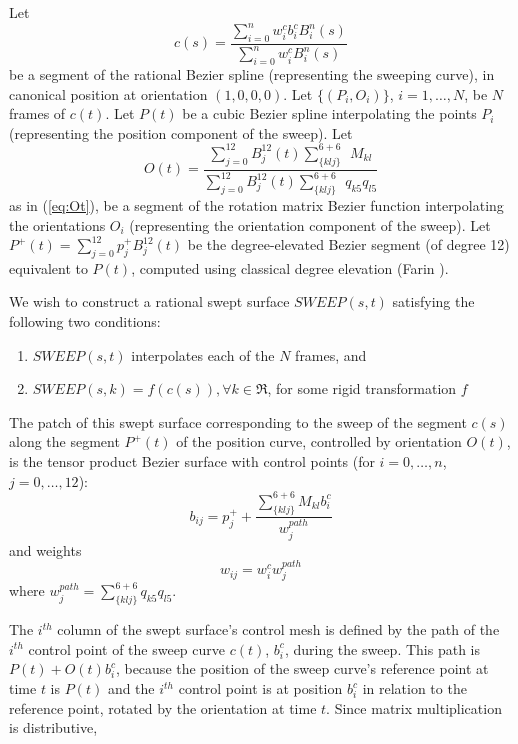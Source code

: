 \begin{theorem}
\label{thm:ten1}
Let 
\[
c(s) = \frac{\sum_{i=0}^n w_i^{c} b_i^{c} B_i^n(s)}
	    {\sum_{i=0}^n w_i^{c} B_i^n(s)}
\]
be a segment of the rational Bezier spline (representing the
sweeping curve), in canonical position at orientation $(1,0,0,0)$.
Let $\{(P_i,O_i)\}$, $i=1,\ldots,N$, be $N$ frames of $c(t)$.
Let $P(t)$ be a cubic Bezier spline interpolating the points $P_i$
(representing the position component of the sweep).
Let 
\[
O(t) = \frac{\sum_{j=0}^{12} B_j^{12}(t) \sum_{\{klj\}}^{6+6}\ \ M_{kl}}
	    {\sum_{j=0}^{12} B_j^{12}(t) \sum_{\{klj\}}^{6+6} \ \ q_{k5}q_{l5}}
\]
as in (\ref{eq:Ot}),
be a segment of the rotation matrix Bezier function
interpolating the orientations $O_i$ 
(representing the orientation component of the sweep).
Let $P^{+}(t) = \sum_{j=0}^{12} p_j^{+} B_j^{12}(t)$
be the degree-elevated Bezier segment (of degree 12) equivalent to $P(t)$, 
computed using classical degree elevation (Farin \cite{farin93}).

We wish to construct a rational swept surface $SWEEP(s,t)$ satisfying 
the following two conditions:
\begin{enumerate}
\item $SWEEP(s,t)$ interpolates each of the $N$ frames, and
\item $SWEEP(s,k) = f(c(s)), \forall k \in \Re$, for some rigid transformation $f$
\end{enumerate}
The patch of this swept surface corresponding to the sweep of the segment
$c(s)$ along the segment $P^{+}(t)$ of the position curve, controlled 
by orientation $O(t)$, is the tensor product Bezier surface with control points
(for $i=0,\ldots,n$, $j=0,\ldots,12$):
\[
b_{ij} = p_j^{+} + \frac{\sum_{\{klj\}}^{6+6} M_{kl} b_i^{c}}{w_j^{path}}
\]
and weights
\[
w_{ij} = w_i^{c}  w_j^{path}
\]
where $w_j^{path} = \sum_{\{klj\}}^{6+6} q_{k5} q_{l5}$.
\end{theorem}
\prf
The $i^{th}$ column of the swept surface's control mesh is defined by
the path of the $i^{th}$ control point of the sweep curve $c(t)$, $b_i^{c}$, 
during the sweep.
This path is $P(t) + O(t)b_i^{c}$, because the position of the sweep
curve's reference point at time $t$ is $P(t)$ and the $i^{th}$ control
point is at position $b_i^c$ in relation to the reference point, rotated
by the orientation at time $t$.
Since matrix multiplication is distributive,
